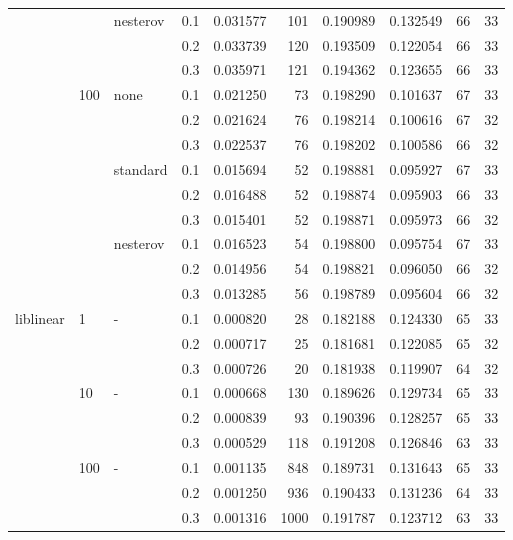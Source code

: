\begin{table}[H]
\begin{tabular}{llllrrrrrr}
          &     & nesterov & 0.1 &  0.031577 &     101 &  0.190989 &  0.132549 &          66 &        33 \\
          &     &   & 0.2 &  0.033739 &     120 &  0.193509 &  0.122054 &          66 &        33 \\
          &     &   & 0.3 &  0.035971 &     121 &  0.194362 &  0.123655 &          66 &        33 \\
          & 100 & none & 0.1 &  0.021250 &      73 &  0.198290 &  0.101637 &          67 &        33 \\
          &     &   & 0.2 &  0.021624 &      76 &  0.198214 &  0.100616 &          67 &        32 \\
          &     &   & 0.3 &  0.022537 &      76 &  0.198202 &  0.100586 &          66 &        32 \\
          &     & standard & 0.1 &  0.015694 &      52 &  0.198881 &  0.095927 &          67 &        33 \\
          &     &   & 0.2 &  0.016488 &      52 &  0.198874 &  0.095903 &          66 &        33 \\
          &     &   & 0.3 &  0.015401 &      52 &  0.198871 &  0.095973 &          66 &        32 \\
          &     & nesterov & 0.1 &  0.016523 &      54 &  0.198800 &  0.095754 &          67 &        33 \\
          &     &   & 0.2 &  0.014956 &      54 &  0.198821 &  0.096050 &          66 &        32 \\
          &     &   & 0.3 &  0.013285 &      56 &  0.198789 &  0.095604 &          66 &        32 \\
liblinear & 1   & - & 0.1 &  0.000820 &      28 &  0.182188 &  0.124330 &          65 &        33 \\
          &     &   & 0.2 &  0.000717 &      25 &  0.181681 &  0.122085 &          65 &        32 \\
          &     &   & 0.3 &  0.000726 &      20 &  0.181938 &  0.119907 &          64 &        32 \\
          & 10  & - & 0.1 &  0.000668 &     130 &  0.189626 &  0.129734 &          65 &        33 \\
          &     &   & 0.2 &  0.000839 &      93 &  0.190396 &  0.128257 &          65 &        33 \\
          &     &   & 0.3 &  0.000529 &     118 &  0.191208 &  0.126846 &          63 &        33 \\
          & 100 & - & 0.1 &  0.001135 &     848 &  0.189731 &  0.131643 &          65 &        33 \\
          &     &   & 0.2 &  0.001250 &     936 &  0.190433 &  0.131236 &          64 &        33 \\
          &     &   & 0.3 &  0.001316 &    1000 &  0.191787 &  0.123712 &          63 &        33 \\
\bottomrule
\end{tabular}
\end{table}
